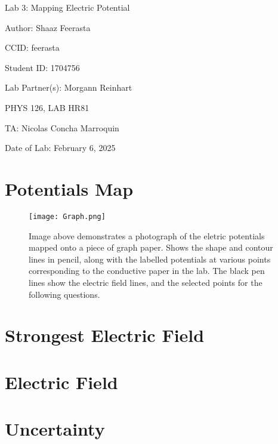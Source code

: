 \documentclass[12pt]{article}
\begin{document}
\pagebreak

\begin{titlepage}
    \begin{center}
        \vspace*{\fill}
        Lab 3: Mapping Electric Potential

        Author: Shaaz Feerasta

        CCID: feerasta

        Student ID: 1704756

        Lab Partner(s): Morgann Reinhart

        PHYS 126, LAB HR81

        TA: Nicolas Concha Marroquin

        Date of Lab: February 6, 2025
        \vspace*{\fill}
    \end{center}
\end{titlepage}

\section{Potentials Map}

\begin{figure}[h]
    \centering
    \texttt{[image: Graph.png]}
    \caption{Image above demonstrates a photograph of the eletric potentials mapped onto a piece of graph paper.
            Shows the shape and contour lines in pencil, along with the labelled potentials at various points
            corresponding to the conductive paper in the lab. The black pen lines show the electric field lines, and the
            selected points for the following questions.}
    \label{fig:diagram}
\end{figure}

\section{Strongest Electric Field}



\section{Electric Field}

\section{Uncertainty}
\end{document}
